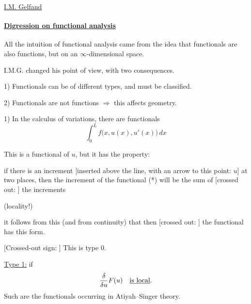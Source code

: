 \underline{I.M. Gelfand}
\paragraph*{\underline{Digression on functional analysis}}
All the intuition of functional analysis came from the idea that functionals are also
functions, but on an $\infty$-dimensional space.

I.M.G. changed his point of view, with two consequences.

1) Functionals can be of different types, and must be classified.

2) Functionals are not functions $\Rightarrow$ this affects geometry.

1) In the calculus of variations, there are functionals
\begin{equation*}
\int_0^L f\bigl(x,u(x),u'(x)\bigr)\,dx \tag{*}
\end{equation*}

This is a functional of $u$, but it has the property:




if there is an increment [inserted above the line, with an arrow to this point: $u$]
at two places, then
the increment of the functional (*) will be the sum of
[crossed out: ]
the increments

(locality!)

\underline{}
it follows from this
(and from continuity)
that then [crossed out: ]
the functional has this form.

[Crossed-out sign: ]
This is type 0.

\underline{Type 1:} if
\begin{equation*}
\frac{\delta}{\delta u}F(u)\quad\text{\underline{is local}.}
\end{equation*}
Such are the functionals occurring in Atiyah--Singer theory.

